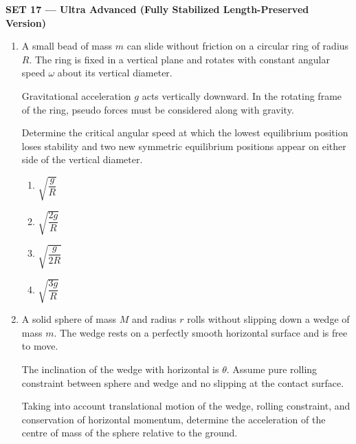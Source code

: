 \documentclass[12pt]{article}
\begin{document}
\begin{center}
{\Large \textbf{SET 17 — Ultra Advanced (Fully Stabilized Length-Preserved Version)}}
\end{center}

\begin{enumerate}[leftmargin=*]

\item A small bead of mass $m$ can slide without friction on a circular ring of radius $R$.  
The ring is fixed in a vertical plane and rotates with constant angular speed $\omega$ about its vertical diameter.  

Gravitational acceleration $g$ acts vertically downward.  
In the rotating frame of the ring, pseudo forces must be considered along with gravity.  

Determine the critical angular speed at which the lowest equilibrium position loses stability and two new symmetric equilibrium positions appear on either side of the vertical diameter.

\begin{center}
\end{center}

\begin{enumerate}
\item $\sqrt{\dfrac{g}{R}}$
\item $\sqrt{\dfrac{2g}{R}}$
\item $\sqrt{\dfrac{g}{2R}}$
\item $\sqrt{\dfrac{3g}{R}}$
\end{enumerate}

\item A solid sphere of mass $M$ and radius $r$ rolls without slipping down a wedge of mass $m$.  
The wedge rests on a perfectly smooth horizontal surface and is free to move.  

The inclination of the wedge with horizontal is $\theta$.  
Assume pure rolling constraint between sphere and wedge and no slipping at the contact surface.  

Taking into account translational motion of the wedge, rolling constraint, and conservation of horizontal momentum, determine the acceleration of the centre of mass of the sphere relative to the ground.


\end{enumerate}
\end{document}
